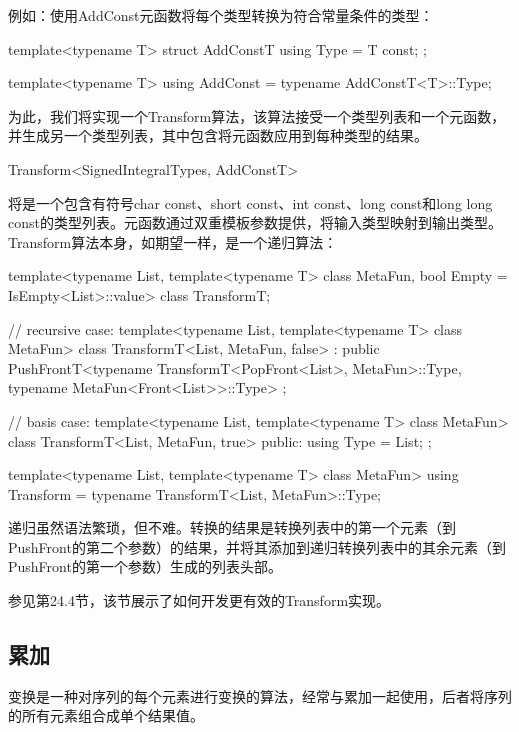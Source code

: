 例如：使用AddConst元函数将每个类型转换为符合常量条件的类型：

\begin{cpp}
template<typename T>
struct AddConstT
{
	using Type = T const;
};

template<typename T>
using AddConst = typename AddConstT<T>::Type;
\end{cpp}

为此，我们将实现一个Transform算法，该算法接受一个类型列表和一个元函数，并生成另一个类型列表，其中包含将元函数应用到每种类型的结果。

\begin{cpp}
Transform<SignedIntegralTypes, AddConstT>
\end{cpp}

将是一个包含有符号char const、short const、int const、long const和long long const的类型列表。元函数通过双重模板参数提供，将输入类型映射到输出类型。Transform算法本身，如期望一样，是一个递归算法：

\begin{cpp}
template<typename List, template<typename T> class MetaFun,
bool Empty = IsEmpty<List>::value>
class TransformT;

// recursive case:
template<typename List, template<typename T> class MetaFun>
class TransformT<List, MetaFun, false>
: public PushFrontT<typename TransformT<PopFront<List>, MetaFun>::Type,
typename MetaFun<Front<List>>::Type>
{
};

// basis case:
template<typename List, template<typename T> class MetaFun>
class TransformT<List, MetaFun, true>
{
	public:
	using Type = List;
};

template<typename List, template<typename T> class MetaFun>
using Transform = typename TransformT<List, MetaFun>::Type;
\end{cpp}

递归虽然语法繁琐，但不难。转换的结果是转换列表中的第一个元素（到PushFront的第二个参数）的结果，并将其添加到递归转换列表中的其余元素（到PushFront的第一个参数）生成的列表头部。

参见第24.4节，该节展示了如何开发更有效的Transform实现。

\subsection{累加}

变换是一种对序列的每个元素进行变换的算法，经常与累加一起使用，后者将序列的所有元素组合成单个结果值。

